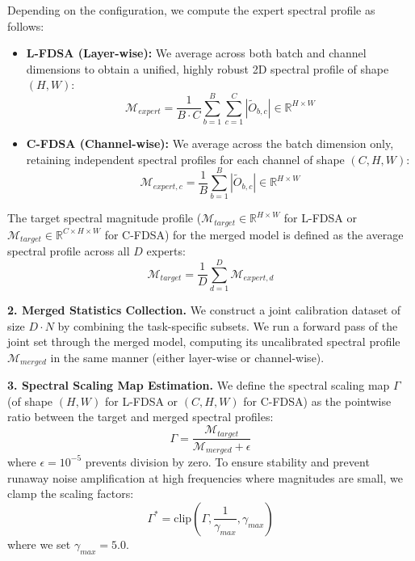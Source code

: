 \documentclass{article}
\begin{document}
Depending on the configuration, we compute the expert spectral profile as follows:
\begin{itemize}
    \item \textbf{L-FDSA (Layer-wise):} We average across both batch and channel dimensions to obtain a unified, highly robust 2D spectral profile of shape $(H, W)$:
    \begin{equation}
        \mathcal{M}_{expert} = \frac{1}{B \cdot C} \sum_{b=1}^B \sum_{c=1}^C | \tilde{O}_{b,c} | \in \mathbb{R}^{H \times W}
    \end{equation}
    \item \textbf{C-FDSA (Channel-wise):} We average across the batch dimension only, retaining independent spectral profiles for each channel of shape $(C, H, W)$:
    \begin{equation}
        \mathcal{M}_{expert, c} = \frac{1}{B} \sum_{b=1}^B | \tilde{O}_{b,c} | \in \mathbb{R}^{H \times W}
    \end{equation}
\end{itemize}

The target spectral magnitude profile ($\mathcal{M}_{target} \in \mathbb{R}^{H \times W}$ for L-FDSA or $\mathcal{M}_{target} \in \mathbb{R}^{C \times H \times W}$ for C-FDSA) for the merged model is defined as the average spectral profile across all $D$ experts:
\begin{equation}
    \mathcal{M}_{target} = \frac{1}{D} \sum_{d=1}^D \mathcal{M}_{expert,d}
\end{equation}

\textbf{2. Merged Statistics Collection.}
We construct a joint calibration dataset of size $D \cdot N$ by combining the task-specific subsets. We run a forward pass of the joint set through the merged model, computing its uncalibrated spectral profile $\mathcal{M}_{merged}$ in the same manner (either layer-wise or channel-wise).

\textbf{3. Spectral Scaling Map Estimation.}
We define the spectral scaling map $\Gamma$ (of shape $(H, W)$ for L-FDSA or $(C, H, W)$ for C-FDSA) as the pointwise ratio between the target and merged spectral profiles:
\begin{equation}
    \Gamma = \frac{\mathcal{M}_{target}}{\mathcal{M}_{merged} + \epsilon}
\end{equation}
where $\epsilon = 10^{-5}$ prevents division by zero. To ensure stability and prevent runaway noise amplification at high frequencies where magnitudes are small, we clamp the scaling factors:
\begin{equation}
    \Gamma^* = \text{clip}(\Gamma, \frac{1}{\gamma_{max}}, \gamma_{max})
\end{equation}
where we set $\gamma_{max} = 5.0$.
\end{document}
